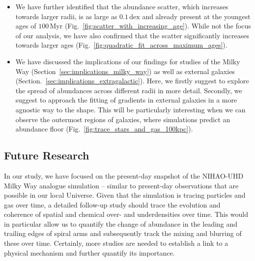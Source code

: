 \documentclass[twocolumn,apj,numberedappendix,appendixfloats,twocolappendix]{openjournal}
\begin{document}
\begin{CJK*}{UTF8}{gbsn}
\begin{itemize}
    \item We have further identified that the abundance scatter, which increases towards larger radii, is as large as $0.1\,\mathrm{dex}$ and already present at the youngest ages of $100\,\mathrm{Myr}$ (Fig.~\ref{fig:scatter_with_increasing_age}). While not the focus of our analysis, we have also confirmed that the scatter significantly increases towards larger ages (Fig.~\ref{fig:quadratic_fit_across_maximum_ages}).
    \item We have discussed the implications of our findings for studies of the Milky Way (Section~\ref{sec:implications_milky_way}) as well as external galaxies (Section.~\ref{sec:implications_extragalactic}). Here, we firstly suggest to explore the spread of abundances across different radii in more detail. Secondly, we suggest to approach the fitting of gradients in external galaxies in a more agnostic way to the shape. This will be particularly interesting when we can observe the outermost regions of galaxies, where simulations predict an abundance floor (Fig.~\ref{fig:trace_stars_and_gas_100kpc}).
\end{itemize}

\subsection{Future Research} \label{sec:future_research}

In our study, we have focused on the present-day snapshot of the NIHAO-UHD Milky Way analogue simulation -- similar to present-day observations that are possible in our local Universe. Given that the simulation is tracing particles and gas over time, a detailed follow-up study should trace the evolution and coherence of spatial and chemical over- and underdensities over time. This would in particular allow us to quantify the change of abundance in the leading and trailing edges of spiral arms and subsequently track the mixing and blurring of these over time. Certainly, more studies are needed to establish a link to a physical mechanism and further quantify its importance.


\end{CJK*}
\end{document}
